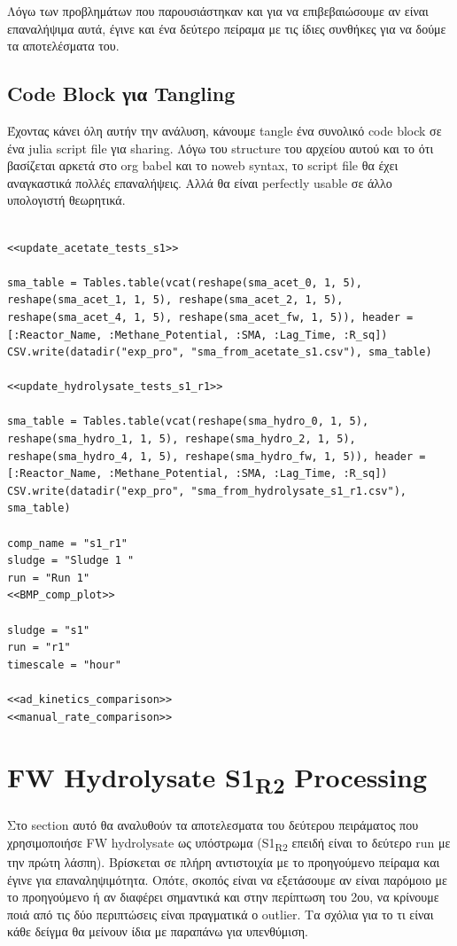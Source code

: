\documentclass[11pt]{article}
\begin{document}
Λόγω των προβλημάτων που παρουσιάστηκαν και για να επιβεβαιώσουμε αν είναι επαναλήψιμα αυτά, έγινε και ένα δεύτερο πείραμα με τις ίδιες συνθήκες για να δούμε τα αποτελέσματα του.

\subsection{Code Block για Tangling}
\label{sec:orga427ac0}
Έχοντας κάνει όλη αυτήν την ανάλυση, κάνουμε tangle ένα συνολικό code block σε ένα julia script file για sharing. Λόγω του structure του αρχείου αυτού και το ότι βασίζεται αρκετά στο org babel και το noweb syntax, το script file θα έχει αναγκαστικά πολλές επαναλήψεις. Αλλά θα είναι perfectly usable σε άλλο υπολογιστή θεωρητικά.

\begin{verbatim}

<<update_acetate_tests_s1>>

sma_table = Tables.table(vcat(reshape(sma_acet_0, 1, 5), reshape(sma_acet_1, 1, 5), reshape(sma_acet_2, 1, 5), reshape(sma_acet_4, 1, 5), reshape(sma_acet_fw, 1, 5)), header = [:Reactor_Name, :Methane_Potential, :SMA, :Lag_Time, :R_sq])
CSV.write(datadir("exp_pro", "sma_from_acetate_s1.csv"), sma_table)

<<update_hydrolysate_tests_s1_r1>>

sma_table = Tables.table(vcat(reshape(sma_hydro_0, 1, 5), reshape(sma_hydro_1, 1, 5), reshape(sma_hydro_2, 1, 5), reshape(sma_hydro_4, 1, 5), reshape(sma_hydro_fw, 1, 5)), header = [:Reactor_Name, :Methane_Potential, :SMA, :Lag_Time, :R_sq])
CSV.write(datadir("exp_pro", "sma_from_hydrolysate_s1_r1.csv"), sma_table)

comp_name = "s1_r1"
sludge = "Sludge 1 "
run = "Run 1"
<<BMP_comp_plot>>

sludge = "s1"
run = "r1"
timescale = "hour"

<<ad_kinetics_comparison>>
<<manual_rate_comparison>>
\end{verbatim}

\section{FW Hydrolysate S1\textsubscript{R2} Processing}
\label{sec:orgc120ae8}
Στο section αυτό θα αναλυθούν τα αποτελεσματα του δεύτερου πειράματος που χρησιμοποιήσε FW hydrolysate ως υπόστρωμα (S1\textsubscript{R2} επειδή είναι το δεύτερο run με την πρώτη λάσπη). Βρίσκεται σε πλήρη αντιστοιχία με το προηγούμενο πείραμα και έγινε για επαναληψιμότητα. Οπότε, σκοπός είναι να εξετάσουμε αν είναι παρόμοιο με το προηγούμενο ή αν διαφέρει σημαντικά και στην περίπτωση του 2ου, να κρίνουμε ποιά από τις δύο περιπτώσεις είναι πραγματικά ο outlier. Τα σχόλια για το τι είναι κάθε δείγμα θα μείνουν ίδια με παραπάνω για υπενθύμιση.
\end{document}
